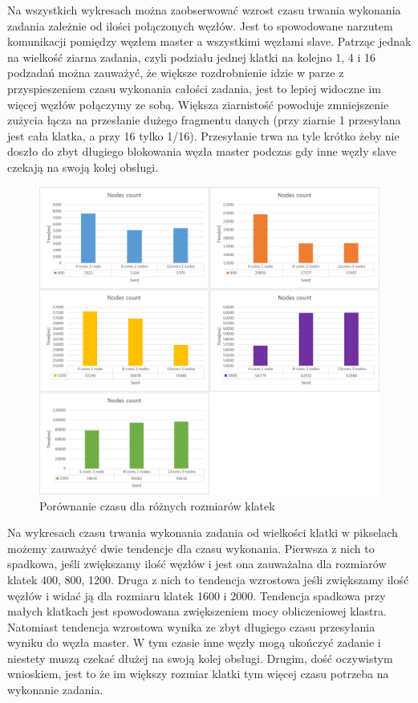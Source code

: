 \documentclass[a4paper]{article}
\begin{document}
Na wszystkich wykresach można zaobserwować wzrost czasu trwania wykonania zadania zależnie od ilości połączonych węzłów. Jest to spowodowane narzutem komunikacji pomiędzy węzłem master a wszystkimi węzłami slave. Patrząc jednak na wielkość ziarna zadania, czyli podziału jednej klatki na kolejno 1, 4 i 16 podzadań można zauważyć, że większe rozdrobnienie idzie w parze z przyspieszeniem czasu wykonania całości zadania, jest to lepiej widoczne im więcej węzłów połączymy ze sobą. Większa ziarnistość powoduje zmniejszenie zużycia łącza na przesłanie dużego fragmentu danych (przy ziarnie 1 przesyłana jest cała klatka, a przy 16 tylko 1/16). Przesyłanie trwa na tyle krótko żeby nie doszło do zbyt długiego blokowania węzła master podczas gdy inne węzły slave czekają na swoją kolej obsługi.

\begin{figure}[H]
    \centering
    \includegraphics[width=\textwidth]{6.png}
    \caption{Porównanie czasu dla różnych rozmiarów klatek}
    \label{fig:my_frac}
\end{figure}

Na wykresach czasu trwania wykonania zadania od wielkości klatki w pikselach możemy zauważyć dwie tendencje dla czasu wykonania. Pierwsza z nich to spadkowa, jeśli zwiększamy ilość węzłów i jest ona zauważalna dla rozmiarów klatek 400, 800, 1200. Druga z nich to tendencja wzrostowa jeśli zwiększamy ilość węzłów i widać ją dla rozmiaru klatek 1600 i 2000. Tendencja spadkowa przy małych klatkach jest spowodowana zwiększeniem mocy obliczeniowej klastra. Natomiast tendencja wzrostowa wynika ze zbyt długiego czasu przesyłania wyniku do węzła master. W tym czasie inne węzły mogą ukończyć zadanie i niestety muszą czekać dłużej na swoją kolej obsługi. Drugim, dość oczywistym wnioskiem, jest to że im większy rozmiar klatki tym więcej czasu potrzeba na wykonanie zadania.
\end{document}
